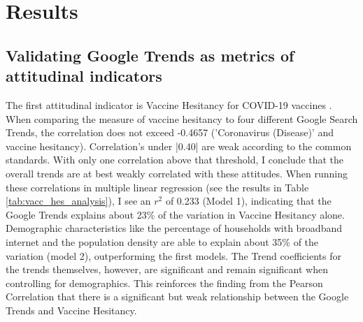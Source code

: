 \section{Results}

\subsection{Validating Google Trends as metrics of attitudinal indicators}




The first attitudinal indicator is Vaccine Hesitancy for COVID-19 vaccines
\citep{vaches_data}. When comparing the measure of vaccine hesitancy to four
different Google Search Trends, the correlation does not exceed -0.4657
('Coronavirus (Disease)' and vaccine hesitancy). Correlation's under |0.40| are
weak according to the common standards. With only one correlation above that
threshold, I conclude that the overall trends are at best weakly correlated with
these attitudes. When running these correlations in multiple linear regression
(see the results in Table \ref{tab:vacc_hes_analysis}), I see an $r^2$ of 0.233
(Model 1), indicating that the Google Trends explains about 23\% of the
variation in Vaccine Hesitancy alone. Demographic characteristics like the
percentage of households with broadband internet and the population density are
able to explain about 35\% of the variation (model 2), outperforming the first
models. The Trend coefficients for the trends themselves, however, are
significant and remain significant when controlling for demographics. This
reinforces the finding from the Pearson Correlation that there is a significant
but weak relationship between the Google Trends and Vaccine Hesitancy.


